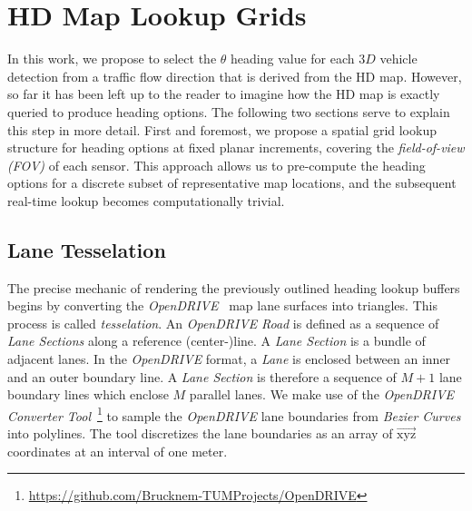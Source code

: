
\section{HD Map Lookup Grids}
\label{sec:hdmapgrids}

In this work, we propose to select the $\theta$ heading value for each $3D$ vehicle detection from a traffic flow direction that is derived from the HD map.
However, so far it has been left up to the reader to imagine how the HD map is exactly queried to produce heading options.
The following two sections serve to explain this step in more detail.
First and foremost, we propose a spatial grid lookup structure for heading options at fixed planar increments, covering the \textit{field-of-view (FOV)} of each sensor.
This approach allows us to pre-compute the heading options for a discrete subset of representative map locations, and the subsequent real-time lookup becomes computationally trivial.

\subsection{Lane Tesselation}
\label{subsec:tesselation}

The precise mechanic of rendering the previously outlined heading lookup buffers begins by converting the \textit{OpenDRIVE}~\cite{dupuis2010opendrive} map lane surfaces into triangles.
This process is called \textit{tesselation}.
An \textit{OpenDRIVE} \textit{Road} is defined as a sequence of \textit{Lane Sections} along a reference (center-)line.
A \textit{Lane Section} is a bundle of adjacent lanes.
In the \textit{OpenDRIVE} format, a \textit{Lane} is enclosed between an inner and an outer boundary line.
A \textit{Lane Section} is therefore a sequence of $M+1$ lane boundary lines which enclose $M$ parallel lanes.
We make use of the \textit{OpenDRIVE Converter Tool}~\footnote{\hyperlink{https://github.com/Brucknem-TUMProjects/OpenDRIVE}{https://github.com/Brucknem-TUMProjects/OpenDRIVE}} to sample the \textit{OpenDRIVE} lane boundaries from \textit{Bezier Curves} into polylines.
The tool discretizes the lane boundaries as an array of $\overrightarrow{\text{xyz}}$ coordinates at an interval of one meter.

